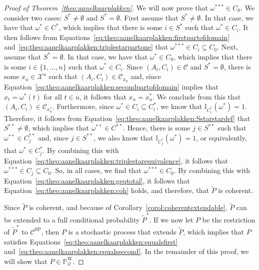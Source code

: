 \documentclass[10pt]{paper}
\theoremstyle{definition}
\newcommand{\states}{\mathcal{X}}
\newcommand{\processes}{\mathbb{P}}
\newcommand{\wprocesses}{\processes^{\mathrm{W}}}
\newcommand{\ind}[1]{\mathbb{I}_{#1}}
\newcommand{\rateset}{\mathcal{Q}}
\begin{document}
\begin{proof}[Proof of Theorem~\ref{theo:aanelkaarplakken}]
We will now prove that $\omega^{***}\in C_0$. We consider two cases: $S^*\neq\emptyset$ and $S^*=\emptyset$. First assume that $S^*\neq\emptyset$. In that case, we have that $\omega^*\in C^*$, which implies that there is some $i\in S^*$ such that $\omega^*\in C_i$. It then follows from Equations~\eqref{eq:theo:aanelkaarplakken:firstpartofdomain} and~\eqref{eq:theo:aanelkaarplakken:triplestarpartone} that $\omega^{***}\in C_i\subseteq C_0$. 
Next, assume that $S^*=\emptyset$. In that case, we have that $\omega^*\in C_0$, which implies that there is some $i\in\{1,\dots,n\}$ such that $\omega^*\in C_i$. Since $(A_i,C_i)\in\mathcal{C}$ and $S^*=\emptyset$, there is some $x_u\in\states^u$ such that $(A_i,C_i)\in\mathcal{C}_{x_u}$ and, since Equation~\eqref{eq:theo:aanelkaarplakken:secondpartofdomain} implies that $x_t=\omega^*(t)$ for all $t\in u$, it follows that $x_u=x_u^*$. We conclude from this that $(A_i,C_i)\in\mathcal{C}_{x_u^*}$. Furthermore, since $\omega^*\in C_i\subseteq C_i^*$, we know that $\ind{C_i^*}(\omega^*)=1$. Therefore, it follows from Equation~\eqref{eq:theo:aanelkaarplakken:Sstarstardef} that $S^{**}\neq\emptyset$, which implies that $\omega^{**}\in C^{**}$. Hence, there is some $j\in S^{**}$ such that $\omega^{**}\in C_j^{**}$ and, since $j\in S^{**}$, we also know that $\ind{C_j^*}(\omega^*)=1$, or equivalently, that $\omega^*\in C_j^*$. By combining this with Equation~\eqref{eq:theo:aanelkaarplakken:triplestarequivalence}, it follows that $\omega^{***}\in C_j\subseteq C_0$.
So, in all cases, we find that $\omega^{***}\in C_0$. By combining this with Equation~\eqref{eq:theo:aanelkaarplakken:geqtotal}, it follows that Equation~\eqref{eq:theo:aanelkaarplakken:coh} holds, and therefore, that $\tilde{P}$ is coherent.


Since $\tilde{P}$ is coherent, and because of Corollary~\ref{corol:coherentextendable}, $\tilde{P}$ can be extended to a full conditional probability $\tilde{P}^*$. If we now let $P$ be the restriction of $\tilde{P}^*$ to $\mathcal{C}^\mathrm{SP}$, then $P$ is a stochastic process that extends $\tilde{P}$, which implies that $P$ satisfies Equations~\eqref{eq:theo:aanelkaarplakken:equalsfirst} and~\eqref{eq:theo:aanelkaarplakken:equalssecond}. In the remainder of this proof, we will show that $P\in\wprocesses_\rateset$.


\end{proof}
\end{document}
